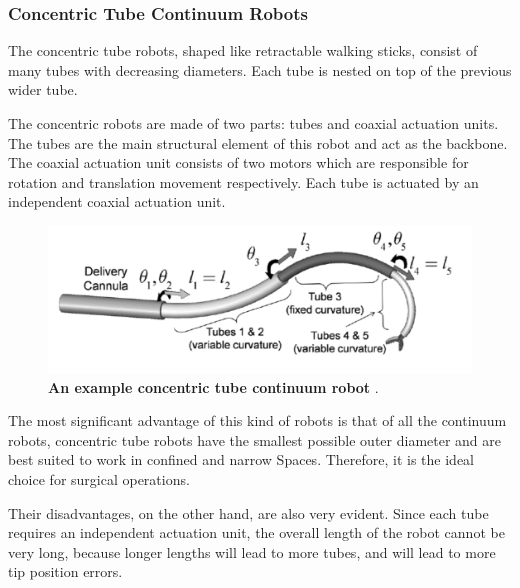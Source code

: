 \subsubsection{Concentric Tube Continuum Robots}
The concentric tube robots, shaped like retractable walking sticks, consist of many tubes with decreasing diameters. Each tube is 
nested on top of the previous wider tube.  

The concentric robots are made of two parts: tubes and coaxial actuation units. The tubes are the main structural element of 
this robot and act as the backbone. The coaxial actuation unit consists of two motors which are responsible for rotation and 
translation movement respectively. Each tube is actuated by an independent coaxial actuation unit. 
\begin{figure}[H] %
    \centering 
    \captionsetup{labelsep=colon}
    \includegraphics[width=.8\textwidth]{Image/LR/concentric_tube_CR.PNG} 
    \caption[An example concentric tube continuum robot]
    {\centering \textbf{An example concentric tube continuum robot} \cite{CTCR_example}.}
    \label{fig:CTCR_example}
\end{figure}
\noindent The most significant advantage of this kind of robots is that of all the continuum robots, concentric tube robots have the 
smallest possible outer diameter and are best suited to work in confined and narrow Spaces. Therefore, it is the ideal choice 
for surgical operations. 

Their disadvantages, on the other hand, are also very evident. Since each tube requires an independent actuation unit, the 
overall length of the robot cannot be very long, because longer lengths will lead to more tubes, and will lead to more tip 
position errors.

\newpage